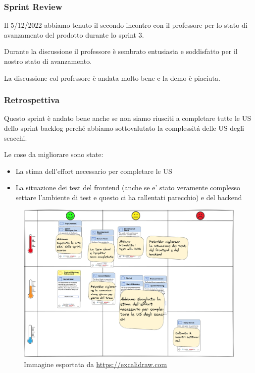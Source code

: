 \documentclass{article}
\begin{document}
\subsubsection{Sprint Review}
Il 5/12/2022 abbiamo tenuto il secondo incontro con il professore per lo stato di avanzamento del prodotto durante lo sprint 3.

Durante la discussione il professore \`e sembrato entusiasta e soddisfatto per il nostro stato di avanzamento.

La discussione col professore \`e andata molto bene e la demo \`e piaciuta.
\subsubsection{Retrospettiva}
Questo sprint \`e andato bene anche se non siamo riusciti a completare tutte le US dello sprint backlog perch\'e abbiamo sottovalutato la complessit\'a delle US degli scacchi.

Le cose da migliorare sono state:
\begin{itemize}
    \item La stima dell'effort necessario per completare le US
    \item La situazione dei test del frontend (anche se e' stato veramente complesso settare l'ambiente di test e questo ci ha rallentati parecchio) e del backend
\end{itemize}
\begin{figure}[H]
    \centering
    \includegraphics[scale=0.065]{retrospettive/retrospettiva-sprint3.png}
    \caption{Immagine esportata da \href{https://excalidraw.com/}{https://excalidraw.com}}
    \label{fig:retrospettiva3}
\end{figure}
\end{document}
